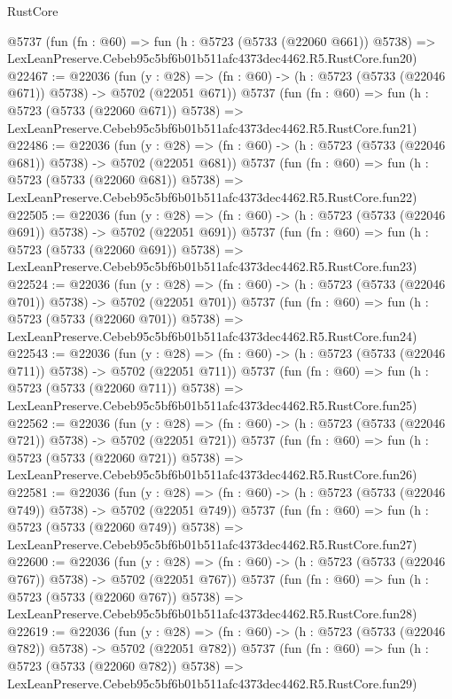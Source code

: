 \begin{lexlean}{RustCore}
\begin{coremodule}
    @5737
    (fun (fn : @60) =>
    fun (h : @5723 (@5733 (@22060 @661)) @5738) =>
    LexLeanPreserve.Cebeb95c5bf6b01b511afc4373dec4462.R5.RustCore.fun20)
@22467 := @22036
    (fun (y : @28) => (fn : @60) -> (h : @5723 (@5733 (@22046 @671)) @5738) -> @5702 (@22051 @671))
    @5737
    (fun (fn : @60) =>
    fun (h : @5723 (@5733 (@22060 @671)) @5738) =>
    LexLeanPreserve.Cebeb95c5bf6b01b511afc4373dec4462.R5.RustCore.fun21)
@22486 := @22036
    (fun (y : @28) => (fn : @60) -> (h : @5723 (@5733 (@22046 @681)) @5738) -> @5702 (@22051 @681))
    @5737
    (fun (fn : @60) =>
    fun (h : @5723 (@5733 (@22060 @681)) @5738) =>
    LexLeanPreserve.Cebeb95c5bf6b01b511afc4373dec4462.R5.RustCore.fun22)
@22505 := @22036
    (fun (y : @28) => (fn : @60) -> (h : @5723 (@5733 (@22046 @691)) @5738) -> @5702 (@22051 @691))
    @5737
    (fun (fn : @60) =>
    fun (h : @5723 (@5733 (@22060 @691)) @5738) =>
    LexLeanPreserve.Cebeb95c5bf6b01b511afc4373dec4462.R5.RustCore.fun23)
@22524 := @22036
    (fun (y : @28) => (fn : @60) -> (h : @5723 (@5733 (@22046 @701)) @5738) -> @5702 (@22051 @701))
    @5737
    (fun (fn : @60) =>
    fun (h : @5723 (@5733 (@22060 @701)) @5738) =>
    LexLeanPreserve.Cebeb95c5bf6b01b511afc4373dec4462.R5.RustCore.fun24)
@22543 := @22036
    (fun (y : @28) => (fn : @60) -> (h : @5723 (@5733 (@22046 @711)) @5738) -> @5702 (@22051 @711))
    @5737
    (fun (fn : @60) =>
    fun (h : @5723 (@5733 (@22060 @711)) @5738) =>
    LexLeanPreserve.Cebeb95c5bf6b01b511afc4373dec4462.R5.RustCore.fun25)
@22562 := @22036
    (fun (y : @28) => (fn : @60) -> (h : @5723 (@5733 (@22046 @721)) @5738) -> @5702 (@22051 @721))
    @5737
    (fun (fn : @60) =>
    fun (h : @5723 (@5733 (@22060 @721)) @5738) =>
    LexLeanPreserve.Cebeb95c5bf6b01b511afc4373dec4462.R5.RustCore.fun26)
@22581 := @22036
    (fun (y : @28) => (fn : @60) -> (h : @5723 (@5733 (@22046 @749)) @5738) -> @5702 (@22051 @749))
    @5737
    (fun (fn : @60) =>
    fun (h : @5723 (@5733 (@22060 @749)) @5738) =>
    LexLeanPreserve.Cebeb95c5bf6b01b511afc4373dec4462.R5.RustCore.fun27)
@22600 := @22036
    (fun (y : @28) => (fn : @60) -> (h : @5723 (@5733 (@22046 @767)) @5738) -> @5702 (@22051 @767))
    @5737
    (fun (fn : @60) =>
    fun (h : @5723 (@5733 (@22060 @767)) @5738) =>
    LexLeanPreserve.Cebeb95c5bf6b01b511afc4373dec4462.R5.RustCore.fun28)
@22619 := @22036
    (fun (y : @28) => (fn : @60) -> (h : @5723 (@5733 (@22046 @782)) @5738) -> @5702 (@22051 @782))
    @5737
    (fun (fn : @60) =>
    fun (h : @5723 (@5733 (@22060 @782)) @5738) =>
    LexLeanPreserve.Cebeb95c5bf6b01b511afc4373dec4462.R5.RustCore.fun29)

\end{coremodule}
\end{lexlean}
